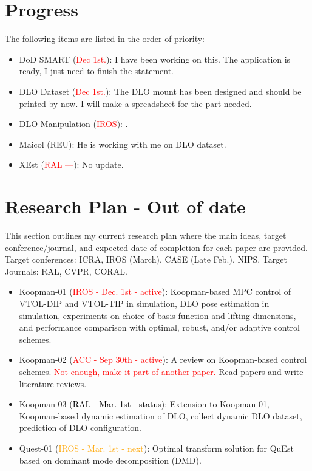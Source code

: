 \documentclass[11pt]{article}
\begin{document}
\section{Progress}
The following items are listed in the order of priority:
\begin{itemize}
  \item DoD SMART (\textcolor{red}{Dec 1st.}): I have been working on this.
  The application is ready, I just need to finish the statement.\\
  \item DLO Dataset (\textcolor{red}{Dec 1st.}): The DLO mount has been designed
  and should be printed by now. I will make a spreadsheet for the part needed.
  \item DLO Manipulation (\textcolor{red}{IROS}): \cite{abraham2017model}.\\
  \item Maicol (REU): He is working with me on DLO dataset. \\
  \item XEst (\textcolor{red}{RAL ---}): No update.\\
  \end{itemize}
\newpage

\newpage



\section{Research Plan - Out of date}
This section outlines my current research plan where the main ideas, target
conference/journal, and expected date of completion for each paper
are provided.
Target conferences: ICRA, IROS (March), CASE (Late Feb.), NIPS.
Target Journals: RAL, CVPR, CORAL.

\begin{itemize}
  \item Koopman-01 (\textcolor{red}{IROS - Dec. 1st - active}):
  Koopman-based MPC control of VTOL-DIP and VTOL-TIP in simulation,
  DLO pose estimation in simulation,
  experiments on choice of basis function and lifting dimensions,
  and performance comparison with optimal, robust, and/or
  adaptive control schemes.\
  \item Koopman-02 (\textcolor{red}{ACC - Sep 30th - active}):
  A review on Koopman-based control schemes. \textcolor{red}{Not enough, make
  it part of another paper.} Read papers and write literature reviews.\

  \item Koopman-03 (\textcolor{black}{RAL - Mar. 1st - status}):
  Extension to Koopman-01, Koopman-based dynamic estimation of DLO,
  collect dynamic DLO dataset,
  prediction of DLO configuration.

  \item Quest-01 (\textcolor{orange}{IROS - Mar. 1st - next}):
  Optimal transform solution for QuEst based on dominant mode decomposition (DMD).

\end{itemize}
\end{document}
